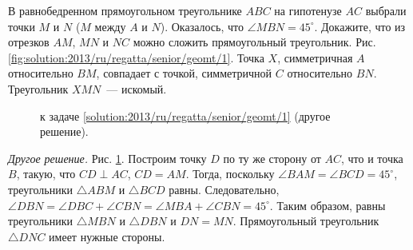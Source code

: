 \problem
В равнобедренном прямоугольном треугольнике $ABC$ на гипотенузе $AC$ выбрали
точки $M$ и $N$ ($M$ между $A$ и $N$).
Оказалось, что $\angle MBN = 45^\circ$.
Докажите, что из отрезков $AM$, $MN$ и $NC$ можно сложить прямоугольный
треугольник.
%
\label{solution:2013/ru/regatta/senior/geomt/1}%
Рис. \ref{fig:solution:2013/ru/regatta/senior/geomt/1}.
Точка $X$, симметричная $A$ относительно $BM$, совпадает с точкой, симметричной
$C$ относительно $BN$.
Треугольник $XMN$~--- искомый.
\par
\begin{figure}
\centering
\caption{к задаче \ref{solution:2013/ru/regatta/senior/geomt/1}
    (другое решение).}
\label{fig:solution:2013/ru/regatta/senior/geomt/1/another}
\end{figure}%
\emph{Другое решение.}
Рис. \ref{fig:solution:2013/ru/regatta/senior/geomt/1/another}.
Построим точку $D$ по ту же сторону от $AC$, что и точка $B$, такую, что
$CD \perp AC$, $CD = AM$.
Тогда, поскольку $\angle BAM = \angle BCD = 45^\circ$, треугольники
$\triangle ABM$ и $\triangle BCD$ равны.
Следовательно,
$\angle DBN = \angle DBC + \angle CBN = \angle MBA + \angle CBN = 45^\circ$.
Таким образом, равны треугольники $\triangle MBN$ и $\triangle DBN$ и
$DN = MN$.
Прямоугольный треугольник $\triangle DNC$ имеет нужные стороны.
\endproblem
